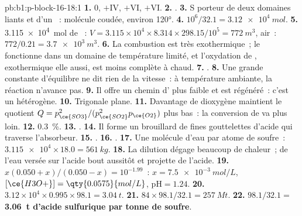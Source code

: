 \begin{solution}{pb:b1:p-block-16-18:1}
\textbf{1.} 0, $+$IV, $+$VI, $+$VI.
\textbf{2.} .
\textbf{3.} S porteur de deux domaines liants et d'un ~: molécule coudée, environ
\ang{120}.
\textbf{4.} $10^6/32.1 = \qty{3.12e4}{mol}$.
\textbf{5.} \qty{3.115e4}{mol} de ~: $V = 3.115 \times 10^4 \times
8.314 \times 298.15/10^5 = \qty{772}{m^3}$, air~: $772/0.21 = \qty{3.7e3}{m^3}$.
\textbf{6.} La combustion est très exothermique~; le 
fonctionne dans un domaine de température limité, et l'oxydation de
, exothermique elle aussi, est moins complète à chaud.
\textbf{7.} .
\textbf{8.} Une grande constante d'équilibre ne dit rien de la vitesse~:
à température ambiante, la réaction n'avance pas.
\textbf{9.} Il offre un chemin d' plus faible et est
régénéré~: c'est un  hétérogène.
\textbf{10.} Trigonale plane.
\textbf{11.} Davantage de dioxygène maintient le quotient
$Q = p_{\ce{SO3}}^2/(p_{\ce{SO2}}^2 p_{\ce{O2}})$ plus bas~: la
conversion
de  va plus loin.
\textbf{12.} \qty{0.3}{\percent}.
\textbf{13.} .
\textbf{14.} Il forme un brouillard de fines gouttelettes d'acide qui
traverse l'absorbeur.
\textbf{15.} .
\textbf{16.} .
\textbf{17.} Une molécule d'eau par atome de soufre~: $\num{3.115e4} \times 18.0 =
\qty{561}{kg}$.
\textbf{18.} La dilution dégage beaucoup de chaleur~; de l'eau versée
sur l'acide bout aussitôt et projette de l'acide.
\textbf{19.} $x(0.050 + x)/(0.050 - x) = 10^{-1.99}$~: $x = \qty{7.5e-3}{mol/L}$,
$[\ce{H3O+}] = \qty{0.0575}{mol/L}$, $\mathrm{pH} = 1.24$.
\textbf{20.} $3.12 \times 10^4 \times 0.995 \times 98.1 = \qty{3.04}{t}$.
\textbf{21.} $84 \times 98.1/32.1 = \qty{257}{Mt}$.
\textbf{22.} $98.1/32.1 =$ \textbf{\qty{3.06}{t} d'acide sulfurique par
tonne de soufre}.
\end{solution}

